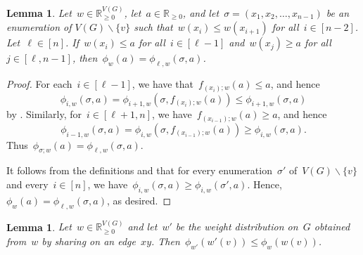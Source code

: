 \documentclass[reqno, 12pt]{amsart}
\numberwithin{equation}{section}
\numberwithin{figure}{section}
\theoremstyle{plain}
\newtheorem{lem}[thm]{Lemma}
\theoremstyle{definition}
\let\setminus=\smallsetminus
\newcommand*{\weights}{\ensuremath{\mathbb{R}_{\geq 0}^{V(G)}}}
\begin{document}
\begin{lem}
    \label{lem-order2}
    Let~${w \in \weights}$, let~${a \in \mathbb{R}_{\geq 0}}$, and let~${\sigma = (x_1, x_2, \ldots, x_{n-1})}$ be an enumeration of ${V(G) \setminus \{v\}}$ 
    such that~${w(x_i) \leq w(x_{i+1})}$ for all~${i \in [n-2]}$. 
    Let~${\ell\in [n]}$. 
    If~${w(x_{i}) \leq a}$ for all~${i \in [\ell-1]}$ and~${w(x_j) \geq a}$ for all~${j \in [\ell, n-1]}$, 
    then~${\phi_w(a) = \phi_{\ell, w}(\sigma, a)}$.
\end{lem}

\begin{proof}
    For each~${i \in [\ell-1]}$, we have that~${f_{(x_i);w}(a) \leq a}$, and hence
    \[
        \phi_{i, w}(\sigma, a) = \phi_{i+1,w} (\sigma,f_{(x_i);w}(a)) \leq \phi_{i+1, w}(\sigma, a)
    \]
    by . 
    Similarly, for~${i \in [\ell+1, n]}$, we have~${f_{(x_{i-1});w}(a) \geq a}$, and hence 
    \[ 
        {\phi_{i-1, w}(\sigma, a)= \phi_{i,w} (\sigma,f_{(x_{i-1});w}(a)) \geq \phi_{i, w}(\sigma, a)}.
    \] 
    Thus~${\phi_{\sigma;w}(a) = \phi_{\ell, w}(\sigma,  a)}$. 
    
    It follows from the definitions and  that for every enumeration~$\sigma'$ of~${V(G) \setminus \{v\}}$ and every~${i \in [n]}$, we have~${\phi_{i,w}(\sigma,a) \geq \phi_{i,w}(\sigma',a)}$. 
    Hence, ${\phi_w(a) = \phi_{\ell, w}(\sigma,  a)}$, as desired. 
\end{proof}



\begin{lem}\label{lem:key-proof2}
    Let~${w \in \weights}$ and let~$w'$ be the weight distribution on~$G$ obtained from~$w$ by sharing on an edge~$xy$. 
    Then~${\phi_{w'}(w'(v)) \leq \phi_{w}(w(v))}$. 
\end{lem}
\end{document}
